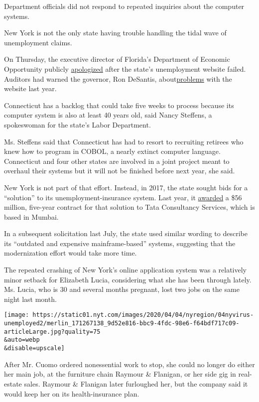Department officials did not respond to repeated inquiries about the
computer systems.

New York is not the only state having trouble handling the tidal wave of
unemployment claims.

On Thursday, the executive director of Florida's Department of Economic
Opportunity publicly
\href{https://www.tampabay.com/news/health/2020/04/02/i-apologize-for-floridas-unemployment-website-fiasco-director-says/}{apologized}
after the state's unemployment website failed. Auditors had warned the
governor, Ron DeSantis,
about\href{https://www.tampabay.com/news/health/2020/03/31/ron-desantis-was-warned-about-floridas-broken-unemployment-website-last-year-audit-shows/}{problems}
with the website last year.

Connecticut has a backlog that could take five weeks to process because
its computer system is also at least 40 years old, said Nancy Steffens,
a spokeswoman for the state's Labor Department.

Ms. Steffens said that Connecticut has had to resort to recruiting
retirees who knew how to program in COBOL, a nearly extinct computer
language. Connecticut and four other states are involved in a joint
project meant to overhaul their systems but it will not be finished
before next year, she said.

New York is not part of that effort. Instead, in 2017, the state sought
bids for a ``solution'' to its unemployment-insurance system. Last year,
it
\href{https://www.osc.state.ny.us/press/releases/july19/070119.htm}{awarded}
a \$56 million, five-year contract for that solution to Tata Consultancy
Services, which is based in Mumbai.

In a subsequent solicitation last July, the state used similar wording
to describe its ``outdated and expensive mainframe-based'' systems,
suggesting that the modernization effort would take more time.

The repeated crashing of New York's online application system was a
relatively minor setback for Elizabeth Lucia, considering what she has
been through lately. Ms. Lucia, who is 30 and several months pregnant,
lost two jobs on the same night last month.

\texttt{[image: https://static01.nyt.com/images/2020/04/04/nyregion/04nyvirus-unemployed2/merlin\_171267138\_9d52e816-bbc9-4fdc-98e6-f64bdf717c09-articleLarge.jpg?quality=75\\\&auto=webp\\\&disable=upscale]}

After Mr. Cuomo ordered nonessential work to stop, she could no longer
do either her main job, at the furniture chain Raymour \& Flanigan, or
her side gig in real-estate sales. Raymour \& Flanigan later furloughed
her, but the company said it would keep her on its health-insurance
plan.

